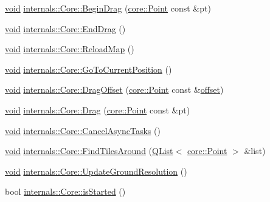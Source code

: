 \begin{DoxyCompactItemize}
\hyperlink{group___u_a_v_objects_plugin_ga444cf2ff3f0ecbe028adce838d373f5c}{void} \hyperlink{group___o_p_map_widget_ga1255054a69438d905b49b903627aef03}{internals\-::\-Core\-::\-Begin\-Drag} (\hyperlink{structcore_1_1_point}{core\-::\-Point} const \&pt)
\item 
\hyperlink{group___u_a_v_objects_plugin_ga444cf2ff3f0ecbe028adce838d373f5c}{void} \hyperlink{group___o_p_map_widget_ga47086f4344e201cc216384fb3acec854}{internals\-::\-Core\-::\-End\-Drag} ()
\item 
\hyperlink{group___u_a_v_objects_plugin_ga444cf2ff3f0ecbe028adce838d373f5c}{void} \hyperlink{group___o_p_map_widget_ga0ca3f365c1668226a6788084d56a6c1d}{internals\-::\-Core\-::\-Reload\-Map} ()
\item 
\hyperlink{group___u_a_v_objects_plugin_ga444cf2ff3f0ecbe028adce838d373f5c}{void} \hyperlink{group___o_p_map_widget_ga868496601dff669c0a6844a27f41e5c7}{internals\-::\-Core\-::\-Go\-To\-Current\-Position} ()
\item 
\hyperlink{group___u_a_v_objects_plugin_ga444cf2ff3f0ecbe028adce838d373f5c}{void} \hyperlink{group___o_p_map_widget_ga87303856077d440b36aa4b53a5103d64}{internals\-::\-Core\-::\-Drag\-Offset} (\hyperlink{structcore_1_1_point}{core\-::\-Point} const \&\hyperlink{glext_8h_ae1b92ae085ddef4b1cdca7d749339fb0}{offset})
\item 
\hyperlink{group___u_a_v_objects_plugin_ga444cf2ff3f0ecbe028adce838d373f5c}{void} \hyperlink{group___o_p_map_widget_gaf302579c11ad5c2448be76ada0b19bf5}{internals\-::\-Core\-::\-Drag} (\hyperlink{structcore_1_1_point}{core\-::\-Point} const \&pt)
\item 
\hyperlink{group___u_a_v_objects_plugin_ga444cf2ff3f0ecbe028adce838d373f5c}{void} \hyperlink{group___o_p_map_widget_gab37e2ea3b3bb0c794bb9abdf84ac5b5d}{internals\-::\-Core\-::\-Cancel\-Async\-Tasks} ()
\item 
\hyperlink{group___u_a_v_objects_plugin_ga444cf2ff3f0ecbe028adce838d373f5c}{void} \hyperlink{group___o_p_map_widget_ga862fd51a3d103dc955ca08f20abe57b0}{internals\-::\-Core\-::\-Find\-Tiles\-Around} (\hyperlink{class_q_list}{Q\-List}$<$ \hyperlink{structcore_1_1_point}{core\-::\-Point} $>$ \&list)
\item 
\hyperlink{group___u_a_v_objects_plugin_ga444cf2ff3f0ecbe028adce838d373f5c}{void} \hyperlink{group___o_p_map_widget_gaafdb82148ca58b162ba477a8e1d520c1}{internals\-::\-Core\-::\-Update\-Ground\-Resolution} ()
\item 
bool \hyperlink{group___o_p_map_widget_ga19e259470609023b204a70c4345ff54c}{internals\-::\-Core\-::is\-Started} ()

\end{DoxyCompactItemize}
